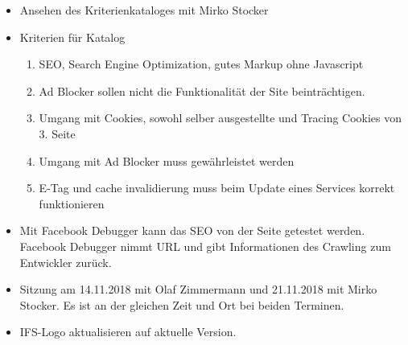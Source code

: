 \documentclass{article}
\begin{document}
\begin{itemize}
    \item Ansehen des Kriterienkataloges mit Mirko Stocker
    \item Kriterien für Katalog
        \begin{enumerate}
            \item SEO, Search Engine Optimization, gutes Markup ohne Javascript
            \item Ad Blocker sollen nicht die Funktionalität der Site beinträchtigen.
            \item Umgang mit Cookies, sowohl selber ausgestellte und Tracing Cookies von 3. Seite
            \item Umgang mit Ad Blocker muss gewährleistet werden
            \item E-Tag und cache invalidierung muss beim Update eines Services korrekt funktionieren
        \end{enumerate}
    \item Mit Facebook Debugger kann das SEO von der Seite getestet werden. Facebook Debugger nimmt URL und gibt Informationen des Crawling zum Entwickler zurück.
    \item Sitzung am 14.11.2018 mit Olaf Zimmermann und 21.11.2018 mit Mirko Stocker. Es ist an der gleichen Zeit und Ort bei beiden Terminen.
    \item IFS-Logo aktualisieren auf aktuelle Version.
\end{itemize}
\end{document}
